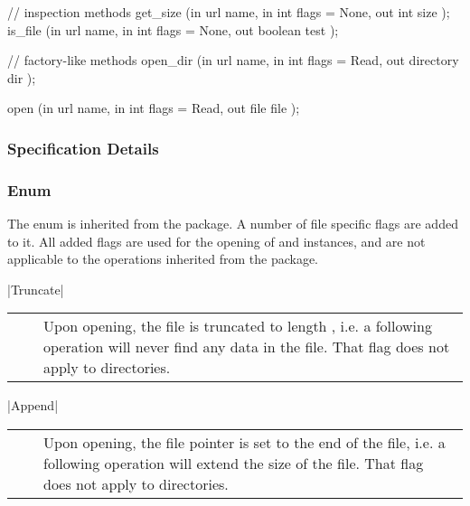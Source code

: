 \begin{myspec}
{{      // inspection methods
      get_size    (in    url               name,
                   in    int               flags = None,
                   out   int               size     );
      is_file     (in    url               name,
                   in    int               flags = None,
                   out   boolean           test     );
 
      // factory-like methods
      open_dir    (in    url               name,
                   in    int               flags = Read,
                   out   directory         dir      );
 
      open        (in    url               name,
                   in    int               flags = Read,
                   out   file              file     );
    }
  }
 \end{myspec}
 
 
 \subsubsection{Specification Details}
 
  \subsubsection*{Enum }
 
  The  enum is inherited from the
   package.  A number of file specific flags are
  added to it.  All added flags are used for the opening of
   and  instances, and are not applicable
  to the operations inherited from the  package.
  
    |Truncate|\\[0.3mm]
    \begin{tabular}{cp{110mm}}
      ~~ & Upon opening, the file is truncated to length 
           \T{0}, i.e. a following \T{read()} operation will 
           never find any data in the file.  That flag does not 
           apply to directories.
    \end{tabular}
 
    |Append|\\[0.3mm]
    \begin{tabular}{cp{110mm}}
      ~~ & Upon opening, the file pointer is set to the 
           end of the file, i.e. a following \T{write()} 
           operation will extend the size of the file.  That 
           flag does not apply to directories.
    \end{tabular}
 
